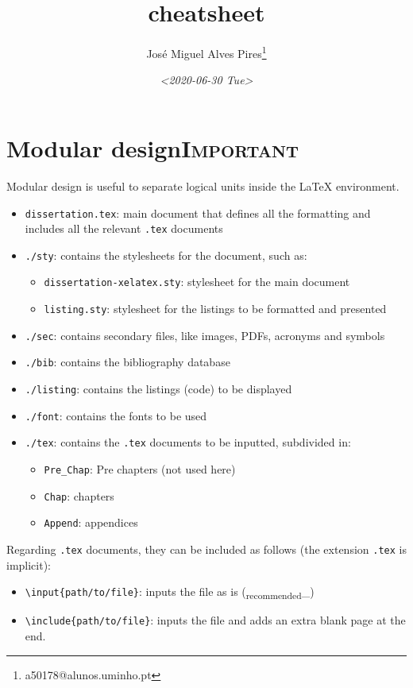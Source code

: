 \documentclass[11pt]{article}
\author{José Miguel Alves Pires\thanks{a50178@alunos.uminho.pt}}
\date{\textit{<2020-06-30 Tue>}}
\title{cheatsheet}
\begin{document}
\maketitle
\tableofcontents


\section{Modular design\hfill{}\textsc{Important}}
\label{sec:org400fc2f}
Modular design is useful to separate logical units inside the \LaTeX{} environment.
\begin{itemize}
\item \texttt{dissertation.tex}: main document that defines all the formatting and includes
all the relevant \texttt{.tex} documents
\item \texttt{./sty}: contains the stylesheets for the document, such as:
\begin{itemize}
\item \texttt{dissertation-xelatex.sty}: stylesheet for the main document
\item \texttt{listing.sty}: stylesheet for the listings to be formatted and presented
\end{itemize}
\item \texttt{./sec}: contains secondary files, like images, PDFs, acronyms and symbols
\item \texttt{./bib}: contains the bibliography database
\item \texttt{./listing}: contains the listings (code) to be displayed
\item \texttt{./font}: contains the fonts to be used
\item \texttt{./tex}: contains the \texttt{.tex} documents to be inputted, subdivided in:
\begin{itemize}
\item \texttt{Pre\_Chap}: Pre chapters (not used here)
\item \texttt{Chap}: chapters
\item \texttt{Append}: appendices
\end{itemize}
\end{itemize}

Regarding \texttt{.tex} documents, they can be included as follows (the extension
\texttt{.tex} is implicit):
\begin{itemize}
\item \texttt{\textbackslash{}input\{path/to/file\}}: inputs the file as is (\textsubscript{recommended}\_)
\item \texttt{\textbackslash{}include\{path/to/file\}}: inputs the file and adds an extra blank page at the
end.
\end{itemize}
\end{document}
